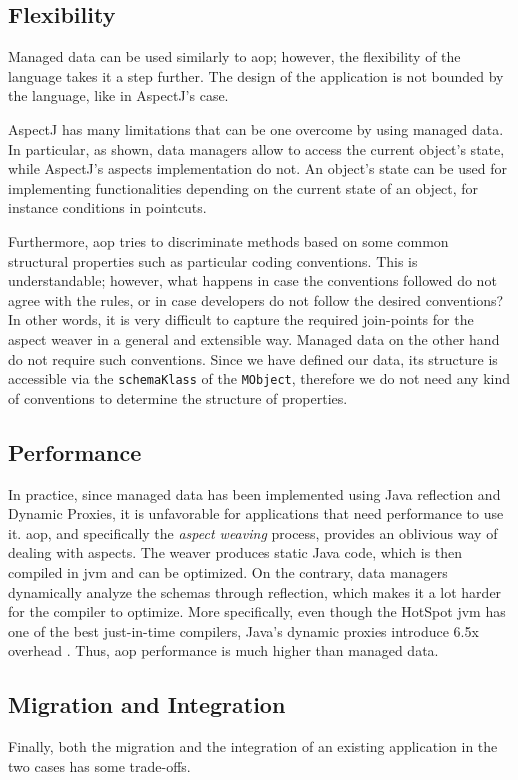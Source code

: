 \subsection{Flexibility}
Managed data can be used similarly to \ac{aop}; however, the flexibility of the language takes it a step further.
The design of the application is not bounded by the language, like in AspectJ's case.

AspectJ has many limitations that can be one overcome by using managed data.
In particular, as shown, data managers allow to access the current object's state, while AspectJ's aspects implementation do not.
An object's state can be used for implementing functionalities depending on the current state of an object, for instance conditions in pointcuts.

Furthermore, \ac{aop} tries to discriminate methods based on some common structural properties such as particular coding conventions. 
This is understandable; however, what happens in case the conventions followed do not agree with the rules, or in case developers do not follow the desired conventions?
In other words, it is very difficult to capture the required join-points for the aspect weaver in a general and extensible way.
Managed data on the other hand do not require such conventions.
Since we have defined our data, its structure is accessible via the \texttt{schemaKlass} of the \texttt{MObject}, therefore we do not need any kind of conventions to determine the structure of properties.

\subsection{Performance}
In practice, since managed data has been implemented using Java reflection and Dynamic Proxies, it is unfavorable for applications that need performance to use it.
\ac{aop}, and specifically the \textit{aspect weaving} process, provides an oblivious way of dealing with aspects.
The weaver produces static Java code, which is then compiled in \ac{jvm} and can be optimized.
On the contrary, data managers dynamically analyze the schemas through reflection, which makes it a lot harder for the compiler to optimize. 
More specifically, even though the HotSpot \ac{jvm} has one of the best just-in-time compilers, Java's dynamic proxies introduce 6.5x overhead \cite{marr2015zero}.
Thus, \ac{aop} performance is much higher than managed data.

\subsection{Migration and Integration}
Finally, both the migration and the integration of an existing application in the two cases has some trade-offs.


